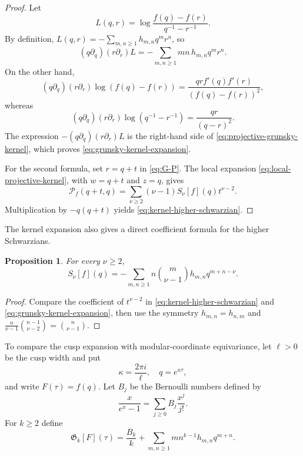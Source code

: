 \documentclass[11pt]{amsart}
\newtheorem{prop}[thm]{Proposition}
\theoremstyle{definition}
\theoremstyle{remark}
\numberwithin{equation}{section}
\begin{document}
\begin{proof}
Let
\[
L(q,r)=\log\frac{f(q)-f(r)}{q^{-1}-r^{-1}}.
\]
By definition, $L(q,r)=-\sum_{m,n\geq1}h_{m,n}q^mr^n$, so
\[
(q\partial_q)(r\partial_r)L
=-\sum_{m,n\geq1}mn\,h_{m,n}q^mr^n.
\]
On the other hand,
\[
(q\partial_q)(r\partial_r)\log(f(q)-f(r))
=\frac{qr f'(q)f'(r)}{(f(q)-f(r))^2},
\]
whereas
\[
(q\partial_q)(r\partial_r)\log(q^{-1}-r^{-1})
=\frac{qr}{(q-r)^2}.
\]
The expression $-(q\partial_q)(r\partial_r)L$ is the right-hand side of \eqref{eq:projective-grunsky-kernel}, which proves \eqref{eq:grunsky-kernel-expansion}.

For the second formula, set $r=q+t$ in \eqref{eq:G-P}. The local expansion \eqref{eq:local-projective-kernel}, with $w=q+t$ and $z=q$, gives
\[
\mathcal P_f(q+t,q)
=\sum_{\nu\geq2}(\nu-1)S_\nu[f](q)t^{\nu-2}.
\]
Multiplication by $-q(q+t)$ yields \eqref{eq:kernel-higher-schwarzian}.
\end{proof}
The kernel expansion also gives a direct coefficient formula for the higher Schwarzians.
\begin{prop}\label{prop:grunsky-local-transform}
For every \(\nu\ge2\),
\begin{equation}\label{eq:higher-schwarzian-grunsky}
S_\nu[f](q)
=
-\sum_{m,n\ge1} n\binom{m}{\nu-1}h_{m,n}q^{m+n-\nu}.
\end{equation}
\end{prop}

\begin{proof}
Compare the coefficient of \(t^{\nu-2}\) in \eqref{eq:kernel-higher-schwarzian} and \eqref{eq:grunsky-kernel-expansion}, then use the symmetry \(h_{m,n}=h_{n,m}\) and
\(
\frac{n}{\nu-1}\binom{n-1}{\nu-2}=\binom{n}{\nu-1}.
\)
\end{proof}

To compare the cusp expansion with modular-coordinate equivariance, let $\ell>0$ be the cusp width and put
\begin{equation*}
\kappa=\frac{2\pi i}{\ell},
\quad
q=e^{\kappa\tau},
\end{equation*}
and write $F(\tau)=f(q)$. Let $B_j$ be the Bernoulli numbers defined by
\begin{equation}\label{eq:Bernoulli}
\frac{x}{e^x-1}=\sum_{j\geq0}B_j\frac{x^j}{j!}.
\end{equation}
For $k\geq2$ define
\begin{equation}\label{eq:Grunsky-moment}
\mathfrak G_k[F](\tau)
=
\frac{B_k}{k}
+
\sum_{m,n\geq1}m n^{k-1}h_{m,n}q^{m+n}.
\end{equation}
\end{document}
